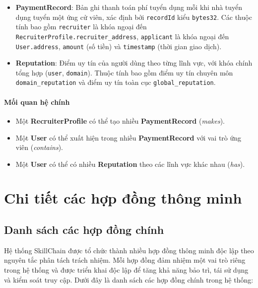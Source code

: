     \begin{itemize}
      \item \textbf{PaymentRecord}: Bản ghi thanh toán phí tuyển dụng mỗi khi nhà tuyển dụng tuyển một ứng cử viên, xác định bởi \texttt{recordId} kiểu \texttt{bytes32}. Các thuộc tính bao gồm \texttt{recruiter} là khóa ngoại đến \texttt{RecruiterProfile.recruiter\_address}, \texttt{applicant} là khóa ngoại đến \texttt{User.address}, \texttt{amount} (số tiền) và \texttt{timestamp} (thời gian giao dịch).
      \item \textbf{Reputation}: Điểm uy tín của người dùng theo từng lĩnh vực, với khóa chính tổng hợp (\texttt{user}, \texttt{domain}). Thuộc tính bao gồm điểm uy tín chuyên môn \texttt{domain\_reputation} và điểm uy tín toàn cục \texttt{global\_reputation}.
    \end{itemize}

  \paragraph{Mối quan hệ chính}
    \begin{itemize}
      \item Một \textbf{RecruiterProfile} có thể tạo nhiều \textbf{PaymentRecord} (\emph{makes}).
      \item Một \textbf{User} có thể xuất hiện trong nhiều \textbf{PaymentRecord} với vai trò ứng viên (\emph{contains}).
      \item Một \textbf{User} có thể có nhiều \textbf{Reputation} theo các lĩnh vực khác nhau (\emph{has}).
    \end{itemize}

\section{Chi tiết các hợp đồng thông minh}

\subsection{Danh sách các hợp đồng chính}

Hệ thống SkillChain được tổ chức thành nhiều hợp đồng thông minh độc lập theo nguyên tắc phân tách trách nhiệm. Mỗi hợp đồng đảm nhiệm một vai trò riêng trong hệ thống và được triển khai độc lập để tăng khả năng bảo trì, tái sử dụng và kiểm soát truy cập. Dưới đây là danh sách các hợp đồng chính trong hệ thống:

